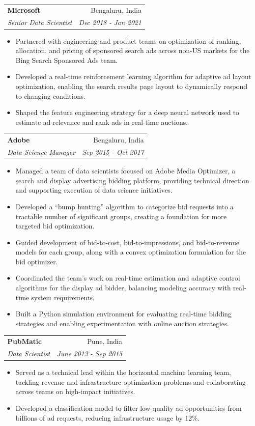 \documentclass[letterpaper,11pt]{article}
\makeatletter
\newcommand{\resumeSubheading}[4]{
  \vspace{-1pt}\item
    \begin{tabular*}{0.97\textwidth}[t]{l@{\extracolsep{\fill}}r}
      \textbf{#1} & #2 \\
      \textit{\small#3} & \textit{\small #4} \\
    \end{tabular*}\vspace{-5pt}
}
\makeatother
\begin{document}
    \resumeSubheading
      {Microsoft}{Bengaluru, India}
      {Senior Data Scientist}{Dec 2018 - Jan 2021}
      \begin{itemize}
        \item Partnered with engineering and product teams on optimization of ranking, allocation, and pricing of sponsored search ads across non-US markets for the Bing Search Sponsored Ads team.
        \item Developed a real-time reinforcement learning algorithm for adaptive ad layout optimization, enabling the search results page layout to dynamically respond to changing conditions.
        \item Shaped the feature engineering strategy for a deep neural network used to estimate ad relevance and rank ads in real-time auctions.
      \end{itemize}

    \resumeSubheading
      {Adobe}{Bengaluru, India}
      {Data Science Manager}{Sep 2015 - Oct 2017}
      \begin{itemize}
        \item Managed a team of data scientists focused on Adobe Media Optimizer, a search and display advertising bidding platform, providing technical direction and supporting execution of data science initiatives.
        \item Developed a ``bump hunting'' algorithm to categorize bid requests into a tractable number of significant groups, creating a foundation for more targeted bid optimization.
        \item Guided development of bid-to-cost, bid-to-impressions, and bid-to-revenue models for each group, along with a convex optimization formulation for the bid optimizer.
        \item Coordinated the team's work on real-time estimation and adaptive control algorithms for the display ad bidder, balancing modeling accuracy with real-time system requirements.
        \item Built a Python simulation environment for evaluating real-time bidding strategies and enabling experimentation with online auction strategies.
      \end{itemize}

    \resumeSubheading
      {PubMatic}{Pune, India}
      {Data Scientist}{June 2013 - Sep 2015}
      \begin{itemize}
        \item Served as a technical lead within the horizontal machine learning team, tackling revenue and infrastructure optimization problems and collaborating across teams on high-impact initiatives.
        \item Developed a classification model to filter low-quality ad opportunities from billions of ad requests, reducing infrastructure usage by 12\%.
      \end{itemize}
\end{document}
